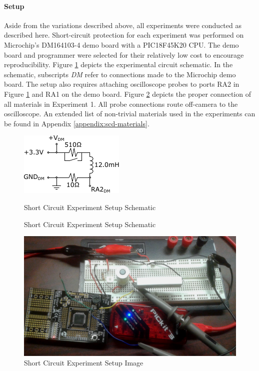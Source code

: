 \paragraph{Setup}
Aside from the variations described above, all experiments were conducted as described here. Short-circuit protection for each experiment was performed on Microchip's DM164103-4 demo board with a PIC18F45K20 CPU. The demo board and programmer were selected for their relatively low cost to encourage reproducibility. 
Figure \ref{fig:ExperimentSetup} depicts the experimental circuit schematic. In the schematic, subscripts \textit{DM} refer to connections made to the Microchip demo board. The setup also requires attaching oscilloscope probes to ports RA2 in Figure \ref{fig:ExperimentSetup} and RA1 on the demo board. Figure \ref{fig:Experiment1Setup} depicts the proper connection of all materials in Experiment 1. All probe connections route off-camera to the oscilloscope. An extended list of non-trivial materials used in the experiments can be found in Appendix \ref{appendix:scd-materials}.
\begin{figure}
    \centering
    \includegraphics[width=0.45\linewidth]{fig/Experiment_Setup.pdf}
    \caption{Short Circuit Experiment Setup Schematic} Short Circuit Experiment Setup Schematic
    \label{fig:ExperimentSetup}
\end{figure}

\begin{figure}
    \centering
    \includegraphics[width=0.75\linewidth]{fig/SCD_5_9mH_EXP_SETUP.jpg}
    \caption{Short Circuit Experiment Setup Image}
    \label{fig:Experiment1Setup}
\end{figure}

